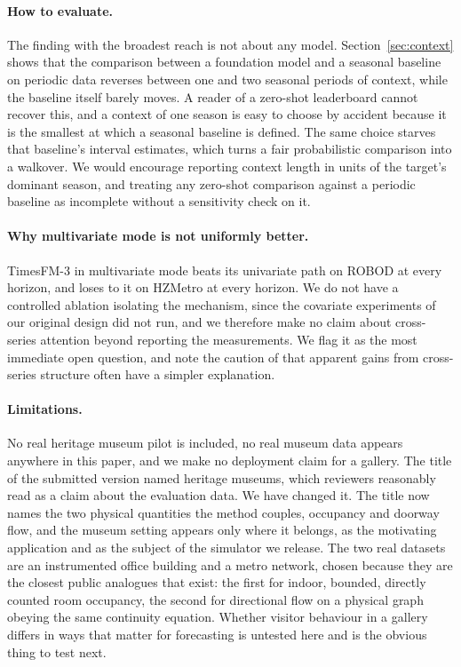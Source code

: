 \documentclass[11pt]{article}
\theoremstyle{plain}
\theoremstyle{definition}
\theoremstyle{remark}
\newif\ifrevisionmarkup
\newcommand{\new}[1]{\ifrevisionmarkup\textcolor{revision}{#1}\else#1\fi}
\begin{document}
\paragraph{How to evaluate.}
The finding with the broadest reach is not about any model. Section~\ref{sec:context} shows that the comparison between a foundation model and a seasonal baseline on periodic data reverses between one and two seasonal periods of context, while the baseline itself barely moves. A reader of a zero-shot leaderboard cannot recover this, and a context of one season is easy to choose by accident because it is the smallest at which a seasonal baseline is defined. The same choice starves that baseline's interval estimates, which turns a fair probabilistic comparison into a walkover. We would encourage reporting context length in units of the target's dominant season, and treating any zero-shot comparison against a periodic baseline as incomplete without a sensitivity check on it.

\paragraph{Why multivariate mode is not uniformly better.}
TimesFM-3 in multivariate mode beats its univariate path on ROBOD at every horizon, and loses to it on HZMetro at every horizon. We do not have a controlled ablation isolating the mechanism, since the covariate experiments of our original design did not run, and we therefore make no claim about cross-series attention beyond reporting the measurements. We flag it as the most immediate open question, and note the caution of \citet{shao2022stid} that apparent gains from cross-series structure often have a simpler explanation.

\paragraph{Limitations.}
\label{sec:limits}
No real heritage museum pilot is included, no real museum data appears anywhere in this paper, and we make no deployment claim for a gallery. \new{The title of the submitted version named heritage museums, which reviewers reasonably read as a claim about the evaluation data. We have changed it. The title now names the two physical quantities the method couples, occupancy and doorway flow, and the museum setting appears only where it belongs, as the motivating application and as the subject of the simulator we release.} The two real datasets are an instrumented office building and a metro network, chosen because they are the closest public analogues that exist: the first for indoor, bounded, directly counted room occupancy, the second for directional flow on a physical graph obeying the same continuity equation. Whether visitor behaviour in a gallery differs in ways that matter for forecasting is untested here and is the obvious thing to test next.
\end{document}
